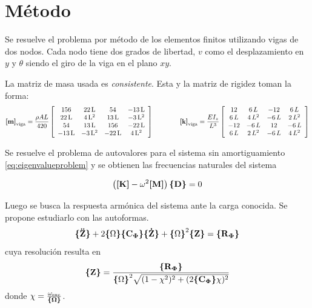 \documentclass[onecolumn,10pt,titlepage,a4paper]{article}
\begin{document}
\section{Método}
Se resuelve el problema por método de los elementos finitos utilizando vigas de dos nodos. Cada nodo tiene dos grados de libertad, $v$ como el desplazamiento en $y$ y $\theta$ siendo el giro de la viga en el plano $x\!y$.

La matriz de masa usada es \textit{consistente}. Esta y la matriz de rigidez toman la forma: \cite[p.379]{cook2007concepts}
\[
\boldsymbol{[}\mathbf{m} \boldsymbol{]}_{\mathrm{viga}}=\frac{\rho A L}{420}\left[\begin{array}{cccc} 156 & 22\,\mathrm{L} & 54 & -13\,\mathrm{L}\\ 22\,\mathrm{L} & 4\,{\mathrm{L}}^2 & 13\,\mathrm{L} & -3\,{\mathrm{L}}^2\\ 54 & 13\,\mathrm{L} & 156 & -22\,\mathrm{L}\\ -13\,\mathrm{L} & -3\,{\mathrm{L}}^2 & -22\,\mathrm{L} & 4\,{\mathrm{L}}^2 \end{array}\right] \qquad \qquad \boldsymbol{[}\mathbf{k} \boldsymbol{]}_{\mathrm{viga}}=\frac{E I_z}{L^3} \left[\begin{array}{cccc} 12 & 6\,L & -12 & 6\,L\\ 6\,L & 4\,L^2 & -6\,L & 2\,L^2\\ -12 & -6\,L & 12 & -6\,L\\ 6\,L & 2\,L^2 & -6\,L & 4\,L^2 \end{array}\right]
\]

Se resuelve el problema de autovalores para el sistema sin amortiguamiento \eqref{eq:eigenvalueproblem} y se obtienen las frecuencias naturales del sistema 

\begin{equation} \label{eq:eigenvalueproblem}
	\left( \boldsymbol{[}\mathbf{K} \boldsymbol{]} - \omega^2 \boldsymbol{[}\mathbf{M} \boldsymbol{]}\right)\boldsymbol{\{ }\mathbf{D} \boldsymbol{\}}= 0
\end{equation}

Luego se busca la respuesta armónica del sistema ante la carga conocida. Se propone estudiarlo con las autoformas.
\begin{equation} \label{eq:Zmodal}
	 \boldsymbol{\{ }\mathbf{\boldsymbol{\ddot{\mathrm{Z}}}} \boldsymbol{\}}+2\boldsymbol{\{ } \Omega \boldsymbol{\} } \boldsymbol{\{ }\mathbf{C{_{\boldsymbol{\Phi}}}} \boldsymbol{\}} \boldsymbol{\{ }\mathbf{\boldsymbol{\dot{\mathrm{Z}}}} \boldsymbol{\}} + \boldsymbol{\{ } \Omega \boldsymbol{\} }^2 \boldsymbol{\{ }\mathbf{Z} \boldsymbol{\}} = \boldsymbol{\{ }\mathbf{R{_{\boldsymbol{\Phi}}}} \boldsymbol{\}}
\end{equation}
cuya resolución resulta en 
\begin{equation}
	\boldsymbol{\{ }\mathbf{Z} \boldsymbol{\}} = \frac{\boldsymbol{\{ }\mathbf{R{_{\boldsymbol{\Phi}}} } \boldsymbol{\}}}{{\boldsymbol{\{ } \Omega \boldsymbol{\} }}^2 \sqrt{(1-\chi^2)^2 + (2 \boldsymbol{\{ }\mathbf{C{_{\boldsymbol{\Phi}}}} \boldsymbol{\}} \chi)^2}}
\end{equation}
donde $\chi = \frac{\omega_{\mathrm{exc}}}{\boldsymbol{\{ }\mathbf{\Omega} \boldsymbol{\}}}$.
\end{document}
